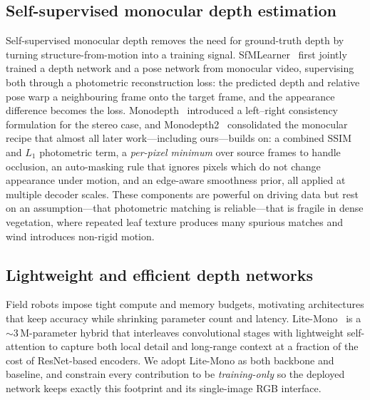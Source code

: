 \documentclass[conference]{IEEEtran}
\begin{document}
\subsection{Self-supervised monocular depth estimation}
Self-supervised monocular depth removes the need for ground-truth depth by turning
structure-from-motion into a training signal. SfMLearner~\cite{zhou2017sfmlearner}
first jointly trained a depth network and a pose network from monocular video,
supervising both through a photometric reconstruction loss: the predicted depth and
relative pose warp a neighbouring frame onto the target frame, and the appearance
difference becomes the loss. Monodepth~\cite{godard2017monodepth} introduced a
left--right consistency formulation for the stereo case, and
Monodepth2~\cite{godard2019monodepth2} consolidated the monocular recipe that almost
all later work---including ours---builds on: a combined SSIM and $L_1$ photometric
term, a \emph{per-pixel minimum} over source frames to handle occlusion, an
auto-masking rule that ignores pixels which do not change appearance under motion, and
an edge-aware smoothness prior, all applied at multiple decoder scales. These
components are powerful on driving data but rest on an assumption---that photometric
matching is reliable---that is fragile in dense vegetation, where repeated leaf
texture produces many spurious matches and wind introduces non-rigid motion.

\subsection{Lightweight and efficient depth networks}
Field robots impose tight compute and memory budgets, motivating architectures that
keep accuracy while shrinking parameter count and latency.
Lite-Mono~\cite{zhang2023litemono} is a $\sim$3\,M-parameter hybrid that interleaves
convolutional stages with lightweight self-attention to capture both local detail and
long-range context at a fraction of the cost of ResNet-based encoders. We adopt
Lite-Mono as both backbone and baseline, and constrain every contribution to be
\emph{training-only} so the deployed network keeps exactly this footprint and its
single-image RGB interface.
\end{document}
